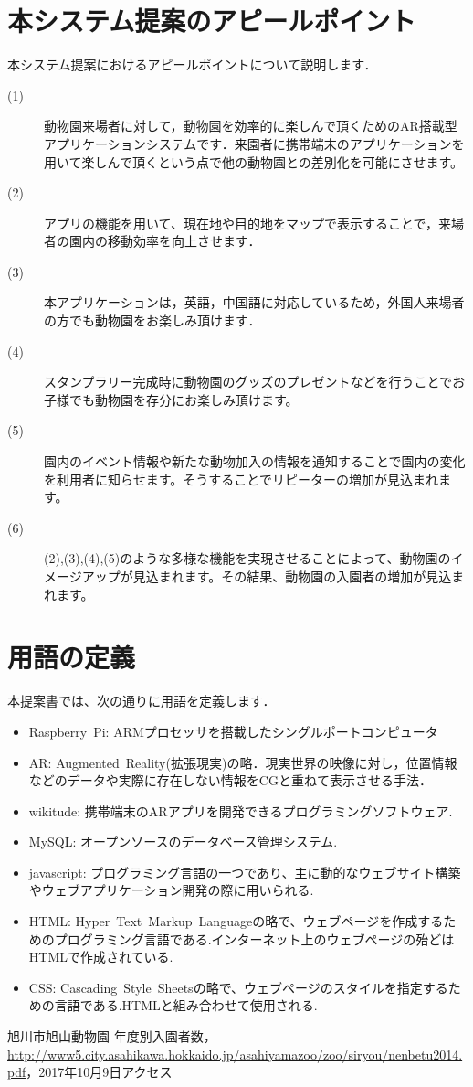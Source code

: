 \documentclass[a4j]{jarticle}
\begin{document}
\section{本システム提案のアピールポイント}
本システム提案におけるアピールポイントについて説明します．
\begin{description}
\item[(1)] 動物園来場者に対して，動物園を効率的に楽しんで頂くためのAR搭載型アプリケーションシステムです．来園者に携帯端末のアプリケーションを用いて楽しんで頂くという点で他の動物園との差別化を可能にさせます。
\item[(2)] アプリの機能を用いて、現在地や目的地をマップで表示することで，来場者の園内の移動効率を向上させます．
\item[(3)] 本アプリケーションは，英語，中国語に対応しているため，外国人来場者の方でも動物園をお楽しみ頂けます．
\item[(4)] スタンプラリー完成時に動物園のグッズのプレゼントなどを行うことでお子様でも動物園を存分にお楽しみ頂けます。
\item[(5)] 園内のイベント情報や新たな動物加入の情報を通知することで園内の変化を利用者に知らせます。そうすることでリピーターの増加が見込まれます。
\item[(6)] (2),(3),(4),(5)のような多様な機能を実現させることによって、動物園のイメージアップが見込まれます。その結果、動物園の入園者の増加が見込まれます。
\end{description}

\section{用語の定義}
  本提案書では、次の通りに用語を定義します．
\begin{itemize}
\item Raspberry~Pi: ARMプロセッサを搭載したシングルポートコンピュータ
\item AR: Augmented~Reality(拡張現実)の略．現実世界の映像に対し，位置情報などのデータや実際に存在しない情報をCGと重ねて表示させる手法．
\item wikitude: 携帯端末のARアプリを開発できるプログラミングソフトウェア.
\item MySQL: オープンソースのデータベース管理システム.
\item javascript: プログラミング言語の一つであり、主に動的なウェブサイト構築やウェブアプリケーション開発の際に用いられる.
\item HTML: Hyper~Text~Markup~Languageの略で、ウェブページを作成するためのプログラミング言語である.インターネット上のウェブページの殆どはHTMLで作成されている.
\item CSS: Cascading~Style~Sheetsの略で、ウェブページのスタイルを指定するための言語である.HTMLと組み合わせて使用される.
\end{itemize}


\begin{thebibliography}{9}
旭川市旭山動物園 年度別入園者数，\url{http://www5.city.asahikawa.hokkaido.jp/asahiyamazoo/zoo/siryou/nenbetu2014.pdf}，2017年10月9日アクセス

\end{thebibliography}
\end{document}

